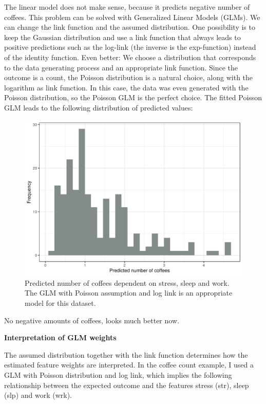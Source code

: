 \documentclass[12pt,]{krantz}
\begin{document}
The linear model does not make sense, because it predicts negative
number of coffees. This problem can be solved with Generalized Linear
Models (GLMs). We can change the link function and the assumed
distribution. One possibility is to keep the Gaussian distribution and
use a link function that always leads to positive predictions such as
the log-link (the inverse is the exp-function) instead of the identity
function. Even better: We choose a distribution that corresponds to the
data generating process and an appropriate link function. Since the
outcome is a count, the Poisson distribution is a natural choice, along
with the logarithm as link function. In this case, the data was even
generated with the Poisson distribution, so the Poisson GLM is the
perfect choice. The fitted Poisson GLM leads to the following
distribution of predicted values:

\begin{figure}

{\centering \includegraphics[width=\textwidth]{images/linear-model-positive-1} 

}

\caption{Predicted number of coffees dependent on stress, sleep and work. The GLM with Poisson assumption and log link is an appropriate model for this dataset.}\label{fig:linear-model-positive}
\end{figure}

No negative amounts of coffees, looks much better now.

\textbf{Interpretation of GLM weights}

The assumed distribution together with the link function determines how
the estimated feature weights are interpreted. In the coffee count
example, I used a GLM with Poisson distribution and log link, which
implies the following relationship between the expected outcome and the
features stress (str), sleep (slp) and work (wrk).
\end{document}

